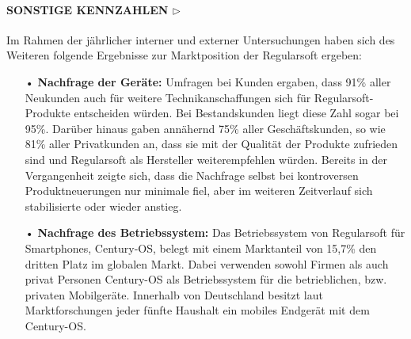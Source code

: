 \documentclass[12pt,titlepage]{article}
\begin{document}
\paragraph{\textbf{SONSTIGE KENNZAHLEN $\triangleright$}}
Im Rahmen der jährlicher interner und externer Untersuchungen haben sich des Weiteren folgende Ergebnisse zur Marktposition der Regularsoft ergeben:
\begin{itemize}
\item[•] \textbf{Nachfrage der Geräte:}
Umfragen bei Kunden ergaben, dass 91\% aller Neukunden auch für weitere Technikanschaffungen sich für Regularsoft-Produkte entscheiden würden. Bei Bestandskunden liegt diese Zahl sogar bei 95\%. Darüber hinaus gaben annähernd 75\% aller Geschäftskunden, so wie 81\% aller Privatkunden an, dass sie mit der Qualität der Produkte zufrieden sind und Regularsoft als Hersteller weiterempfehlen würden. Bereits in der Vergangenheit zeigte sich, dass die Nachfrage selbst bei kontroversen Produktneuerungen nur minimale fiel, aber im weiteren Zeitverlauf sich stabilisierte oder wieder anstieg.
\item[•] \textbf{Nachfrage des Betriebssystem:}
Das Betriebssystem von Regularsoft für Smartphones, Century-OS, belegt mit einem Marktanteil von 15,7\% den dritten Platz im globalen Markt. Dabei verwenden sowohl Firmen als auch privat Personen Century-OS als Betriebssystem für die betrieblichen, bzw. privaten Mobilgeräte. Innerhalb von Deutschland besitzt laut Marktforschungen jeder fünfte Haushalt ein mobiles Endgerät mit dem Century-OS.
\end{itemize}
\end{document}
